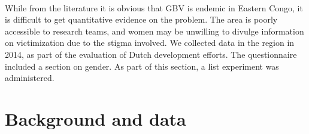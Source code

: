 \documentclass[11pt,a4paper]{scrartcl} %
\begin{document}


\paragraph{}
While from the literature it is obvious that GBV is endemic in Eastern Congo, it is difficult to get quantitative evidence on the problem. The area is poorly accessible to research teams, and women may be unwilling to divulge information on victimization due to the stigma involved. We collected data in the region in 2014, as part of the evaluation of Dutch development efforts. The questionnaire included a section on gender. As part of this section, a list experiment was administered.

\paragraph{}


\section*{Background and data}
\end{document}
